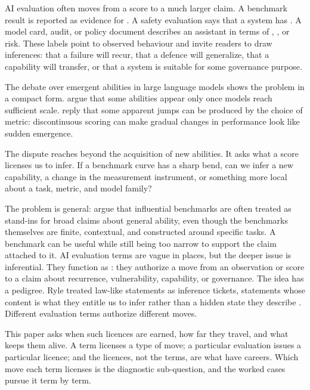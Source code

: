 \documentclass[12pt]{article}
\begin{document}
AI evaluation often moves from a score to a much larger claim. A benchmark result
is reported as evidence for . A safety evaluation says that a
system has . A model card, audit, or policy document
describes an assistant in terms of , , or
 risk. These labels point to observed behaviour and invite
readers to draw inferences: that a failure will recur, that a defence will
generalize, that a capability will transfer, or that a system is suitable for
some governance purpose.

The debate over emergent abilities in large language models shows the problem in
a compact form. \textcite{wei2022emergent} argue that some abilities appear only
once models reach sufficient scale. \textcite{schaeffer2023emergent} reply that
some apparent jumps can be produced by the choice of metric: discontinuous
scoring can make gradual changes in performance look like sudden emergence.

The dispute reaches beyond the acquisition of new abilities. It asks what a score
licenses us to infer. If a benchmark curve has a sharp bend, can we
infer a new capability, a change in the measurement instrument, or something
more local about a task, metric, and model family?

The problem is general: \textcite{raji2021whole}
argue that influential benchmarks are often treated as stand-ins for broad
claims about general ability, even though the benchmarks themselves are finite,
contextual, and constructed around specific tasks. A benchmark can be useful
while still being too narrow to support the claim attached to it. AI evaluation
terms are vague in places, but the deeper issue is inferential. They function as
: they authorize a move from an observation or score to
a claim about recurrence, vulnerability, capability, or governance. The idea has
a pedigree. Ryle treated law-like statements as inference tickets, statements
whose content is what they entitle us to infer rather than a hidden state they
describe \citep{ryle1949concept}. Different evaluation terms authorize
different moves.

This paper asks when such licences are earned, how far they travel, and what
keeps them alive. A term licenses a type of move; a particular evaluation
issues a particular licence; and the licences, not the terms, are what have
careers. Which move each term licenses is the diagnostic sub-question, and the
worked cases pursue it term by term.
\end{document}
